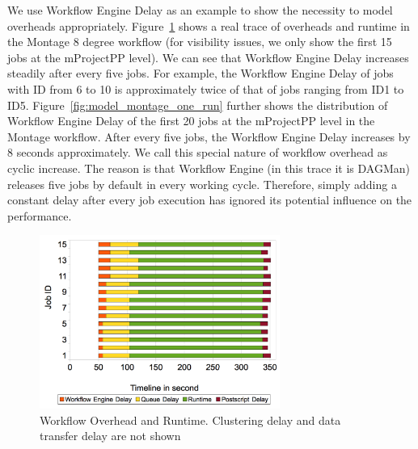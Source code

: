 We use Workflow Engine Delay as an example to show the necessity to model overheads appropriately. Figure~\ref{fig:model_montage_timeline} shows a real trace of overheads and runtime in the Montage 8 degree workflow (for visibility issues, we only show the first 15 jobs at the mProjectPP level). We can see that Workflow Engine Delay increases steadily after every five jobs. For example, the Workflow Engine Delay of jobs with ID from 6 to 10 is approximately twice of that of jobs ranging from ID1 to ID5. Figure~\ref{fig:model_montage_one_run} further shows the distribution of Workflow Engine Delay of the first 20 jobs at the mProjectPP level in the Montage workflow. After every five jobs, the Workflow Engine Delay increases by 8 seconds approximately. We call this special nature of workflow overhead as cyclic increase. The reason is that Workflow Engine (in this trace it is DAGMan) releases five jobs by default in every working cycle. Therefore, simply adding a constant delay after every job execution has ignored its potential influence on the performance.

\begin{figure}[h!]
	\centering
    \includegraphics[width=0.7\textwidth]{figures/model/overhead_timeline2.pdf}
    \caption{Workflow Overhead and Runtime. Clustering delay and data transfer delay are not shown}
    \label{fig:model_montage_timeline}
\end{figure}




